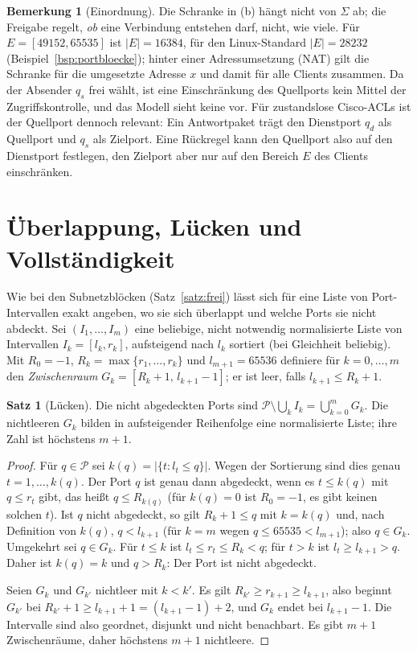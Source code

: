 \documentclass[a4paper,12pt, twoside]{report}
\theoremstyle{definition}
\newtheorem{satz}{Satz}
\newtheorem{bemerkung}{Bemerkung}
\begin{document}
\begin{bemerkung}[Einordnung]
	Die Schranke in (b) hängt nicht von $\Sigma$ ab; die Freigabe regelt, \emph{ob} eine Verbindung entstehen darf, nicht, wie viele. Für $E=[49152,65535]$ ist $|E|=16384$, für den Linux-Standard $|E|=28232$ (Beispiel~\ref{bsp:portbloecke}); hinter einer Adressumsetzung (NAT) gilt die Schranke für die umgesetzte Adresse $x$ und damit für alle Clients zusammen. Da der Absender $q_s$ frei wählt, ist eine Einschränkung des Quellports kein Mittel der Zugriffskontrolle, und das Modell sieht keine vor. Für zustandslose Cisco-ACLs ist der Quellport dennoch relevant: Ein Antwortpaket trägt den Dienstport $q_d$ als Quellport und $q_s$ als Zielport. Eine Rückregel kann den Quellport also auf den Dienstport festlegen, den Zielport aber nur auf den Bereich $E$ des Clients einschränken.
\end{bemerkung}

\section{Überlappung, Lücken und Vollständigkeit}

Wie bei den Subnetzblöcken (Satz~\ref{satz:frei}) lässt sich für eine Liste von Port-Intervallen exakt angeben, wo sie sich überlappt und welche Ports sie nicht abdeckt. Sei $(I_1,\ldots,I_m)$ eine beliebige, nicht notwendig normalisierte Liste von Intervallen $I_k=[l_k,r_k]$, aufsteigend nach $l_k$ sortiert (bei Gleichheit beliebig). Mit $R_0=-1$, $R_k=\max\{r_1,\ldots,r_k\}$ und $l_{m+1}=65536$ definiere für $k=0,\ldots,m$ den \emph{Zwischenraum} $G_k=[R_k+1,\,l_{k+1}-1]$; er ist leer, falls $l_{k+1}\le R_k+1$.

\begin{satz}[Lücken]
\label{satz:luecken}
	Die nicht abgedeckten Ports sind $\mathcal{P}\setminus\bigcup_kI_k=\bigcup_{k=0}^{m}G_k$. Die nichtleeren $G_k$ bilden in aufsteigender Reihenfolge eine normalisierte Liste; ihre Zahl ist höchstens $m+1$.
\end{satz}

\begin{proof}
	Für $q\in\mathcal{P}$ sei $k(q)=|\{t:l_t\le q\}|$. Wegen der Sortierung sind dies genau $t=1,\ldots,k(q)$. Der Port $q$ ist genau dann abgedeckt, wenn es $t\le k(q)$ mit $q\le r_t$ gibt, das heißt $q\le R_{k(q)}$ (für $k(q)=0$ ist $R_0=-1$, es gibt keinen solchen $t$). Ist $q$ nicht abgedeckt, so gilt $R_k+1\le q$ mit $k=k(q)$ und, nach Definition von $k(q)$, $q<l_{k+1}$ (für $k=m$ wegen $q\le 65535<l_{m+1}$); also $q\in G_k$. Umgekehrt sei $q\in G_k$. Für $t\le k$ ist $l_t\le r_t\le R_k<q$; für $t>k$ ist $l_t\ge l_{k+1}>q$. Daher ist $k(q)=k$ und $q>R_k$: Der Port ist nicht abgedeckt.

	Seien $G_k$ und $G_{k'}$ nichtleer mit $k<k'$. Es gilt $R_{k'}\ge r_{k+1}\ge l_{k+1}$, also beginnt $G_{k'}$ bei $R_{k'}+1\ge l_{k+1}+1=(l_{k+1}-1)+2$, und $G_k$ endet bei $l_{k+1}-1$. Die Intervalle sind also geordnet, disjunkt und nicht benachbart. Es gibt $m+1$ Zwischenräume, daher höchstens $m+1$ nichtleere.
\end{proof}
\end{document}
